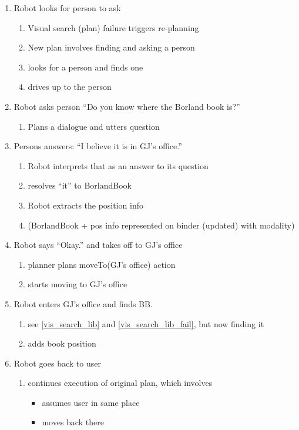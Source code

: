 \documentclass{article}
\begin{document}
\begin{enumerate}
\item \label{lvl2:9}
	Robot looks for person to ask
	\begin{enumerate}
	\item Visual search (plan) failure triggers re-planning
	\item New plan involves finding and asking a person
	\item looks for a person and finds one
	\item drives up to the person
	\end{enumerate}
	
\item \label{lvl2:10} 
	Robot asks person ``Do you know where the Borland book is?''
	\begin{enumerate}
	\item Plans a dialogue and utters question
	\end{enumerate}

\item Persons answers: ``I believe it is in GJ's office.''
	\begin{enumerate}
	\item Robot interprets that as an answer to its question
	\item resolves ``it'' to BorlandBook
	\item Robot extracts the position info
	\item (BorlandBook + pos info represented on binder (updated) with modality)
	\end{enumerate}

\item Robot says ``Okay.'' and takes off to GJ's office
	\begin{enumerate}
	\item planner plans moveTo(GJ's office) action
	\item starts moving to GJ's office
	\end{enumerate}
	
\item Robot enters GJ's office and finds BB.
	\begin{enumerate}
	\item see \ref{vis_search_lib} and \ref{vis_search_lib_fail}, but now finding it
	\item adds book position
	\end{enumerate}

\item Robot goes back to user
	\begin{enumerate}
	\item continues execution of original plan, which involves
		\begin{itemize}
		\item assumes user in same place
		\item moves back there
		\end{itemize}
	\end{enumerate}


\end{enumerate}
\end{document}
